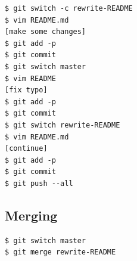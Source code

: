 \begin{frame}[fragile]
  \begin{example}
    \begin{lstlisting}
$ git switch -c rewrite-README
$ vim README.md
[make some changes]
$ git add -p
$ git commit
$ git switch master
$ vim README
[fix typo]
$ git add -p
$ git commit
$ git switch rewrite-README
$ vim README.md
[continue]
$ git add -p
$ git commit
$ git push --all
    \end{lstlisting}
  \end{example}
\end{frame}

\subsection{Merging}

\begin{frame}[fragile]
  \begin{example}[Merging]
    \begin{lstlisting}
$ git switch master
$ git merge rewrite-README
    \end{lstlisting}
  \end{example}
\end{frame}

